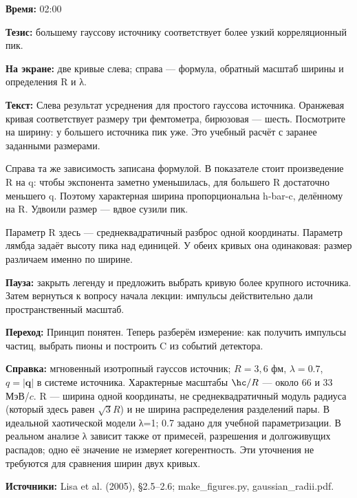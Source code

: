 \textbf{Время:} 02:00

\textbf{Тезис:} большему гауссову источнику соответствует более узкий корреляционный пик.

\textbf{На экране:} две кривые слева; справа — формула, обратный масштаб ширины и определения R и λ.

\textbf{Текст:} Слева результат усреднения для простого гауссова источника. Оранжевая кривая соответствует размеру три фемтометра, бирюзовая — шесть. Посмотрите на ширину: у большего источника пик уже. Это учебный расчёт с заранее заданными размерами.

Справа та же зависимость записана формулой. В показателе стоит произведение R на q: чтобы экспонента заметно уменьшилась, для большего R достаточно меньшего q. Поэтому характерная ширина пропорциональна h-bar-c, делённому на R. Удвоили размер — вдвое сузили пик.

Параметр R здесь — среднеквадратичный разброс одной координаты. Параметр лямбда задаёт высоту пика над единицей. У обеих кривых она одинаковая: размер различаем именно по ширине.

\textbf{Пауза:} закрыть легенду и предложить выбрать кривую более крупного источника. Затем вернуться к вопросу начала лекции: импульсы действительно дали пространственный масштаб.

\textbf{Переход:} Принцип понятен. Теперь разберём измерение: как получить импульсы частиц, выбрать пионы и построить C из событий детектора.

\textbf{Справка:} мгновенный изотропный гауссов источник; \(R=3,6\) фм, \(\lambda=0.7\), \(q=|\mathbf q|\) в системе источника. Характерные масштабы \(\hc/R\) — около 66 и 33 МэВ/\(c\). R — ширина одной координаты, не среднеквадратичный модуль радиуса (который здесь равен \(\sqrt3R\)) и не ширина распределения разделений пары. В идеальной хаотической модели λ=1; 0.7 задано для учебной параметризации. В реальном анализе λ зависит также от примесей, разрешения и долгоживущих распадов; одно её значение не измеряет когерентность. Эти уточнения не требуются для сравнения ширин двух кривых.

\textbf{Источники:} Lisa et al. (2005), §2.5–2.6; make\_figures.py, gaussian\_radii.pdf.
